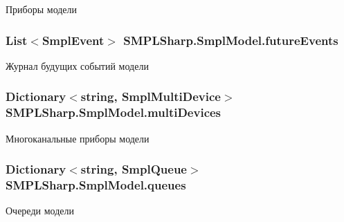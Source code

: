 Приборы модели 

\hypertarget{class_s_m_p_l_sharp_1_1_smpl_model_ac57b9b5e15eb34682873492bab42445f}{
\subsubsection[{future\-Events}]{\setlength{\rightskip}{0pt plus 5cm}List$<${\bf Smpl\-Event}$>$ S\-M\-P\-L\-Sharp.\-Smpl\-Model.\-future\-Events\hspace{0.3cm}{\ttfamily [protected]}}}\label{df/d34/class_s_m_p_l_sharp_1_1_smpl_model_ac57b9b5e15eb34682873492bab42445f}


Журнал будущих событий модели 

\hypertarget{class_s_m_p_l_sharp_1_1_smpl_model_a711b2226de9b75bd541ddca587fb5e45}{
\subsubsection[{multi\-Devices}]{\setlength{\rightskip}{0pt plus 5cm}Dictionary$<$string, {\bf Smpl\-Multi\-Device}$>$ S\-M\-P\-L\-Sharp.\-Smpl\-Model.\-multi\-Devices\hspace{0.3cm}{\ttfamily [protected]}}}\label{df/d34/class_s_m_p_l_sharp_1_1_smpl_model_a711b2226de9b75bd541ddca587fb5e45}


Многоканальные приборы модели 

\hypertarget{class_s_m_p_l_sharp_1_1_smpl_model_ace458c3e9bb07de68137027426eeee82}{
\subsubsection[{queues}]{\setlength{\rightskip}{0pt plus 5cm}Dictionary$<$string, {\bf Smpl\-Queue}$>$ S\-M\-P\-L\-Sharp.\-Smpl\-Model.\-queues\hspace{0.3cm}{\ttfamily [protected]}}}\label{df/d34/class_s_m_p_l_sharp_1_1_smpl_model_ace458c3e9bb07de68137027426eeee82}


Очереди модели 



